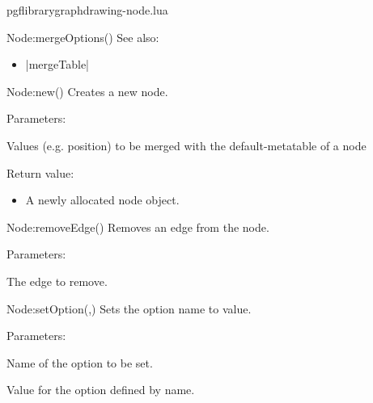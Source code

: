 \begin{filedescription}{pgflibrarygraphdrawing-node.lua}
\begin{luacommand}{{Node:mergeOptions}()}
See also:
\begin{itemize}
	\item[] |mergeTable|
\end{itemize}

\end{luacommand}\begin{luacommand}{{Node:new}()}
Creates a new node.

Parameters:
\begin{parameterdescription}
	\item[\meta{values}] Values (e.g. position) to be merged with the default-metatable of a node
\end{parameterdescription}


Return value:
\begin{itemize} \item[] A newly allocated node object. \end{itemize}


\end{luacommand}\begin{luacommand}{{Node:removeEdge}()}
Removes an edge from the node.

Parameters:
\begin{parameterdescription}
	\item[\meta{edge}] The edge to remove.
\end{parameterdescription}



\end{luacommand}\begin{luacommand}{{Node:setOption}(,)}
Sets the option name to value.

Parameters:
\begin{parameterdescription}
	\item[\meta{name}] Name of the option to be set.\item[\meta{value}] Value for the option defined by name.
\end{parameterdescription}



\end{luacommand}
\end{filedescription}
